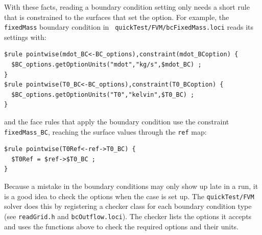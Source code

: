 %
With these facts, reading a boundary condition setting only needs
a short rule that is constrained to the surfaces that set the option.
For example, the {\tt fixedMass} boundary condition in {\tt
  quickTest/FVM/bcFixedMass.loci} reads its settings with:
\begin{verbatim}
$rule pointwise(mdot_BC<-BC_options),constraint(mdot_BCoption) {
  $BC_options.getOptionUnits("mdot","kg/s",$mdot_BC) ;
}
$rule pointwise(T0_BC<-BC_options),constraint(T0_BCoption) {
  $BC_options.getOptionUnits("T0","kelvin",$T0_BC) ;
}
\end{verbatim}
and the face rules that apply the boundary condition use the
constraint {\tt fixedMass\_BC}, reaching the surface values through
the {\tt ref} map:
\begin{verbatim}
$rule pointwise(T0Ref<-ref->T0_BC) {
  $T0Ref = $ref->$T0_BC ;
}
\end{verbatim}
%
Because a mistake in the boundary conditions may only show up late in
a run, it is a good idea to check the options when the case is set up.
The {\tt quickTest/FVM} solver does this by registering a checker
class for each boundary condition type (see {\tt readGrid.h} and
{\tt bcOutflow.loci}).  The checker lists the options it accepts and
uses the functions above to check the required options and their
units.
%

